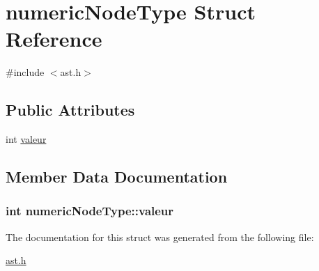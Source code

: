 \hypertarget{structnumericNodeType}{}\section{numeric\+Node\+Type Struct Reference}
\label{structnumericNodeType}


{\ttfamily \#include $<$ast.\+h$>$}

\subsection*{Public Attributes}
\begin{DoxyCompactItemize}
\item 
int \hyperlink{structnumericNodeType_a83d1186d182d49a378276ccaa72031c6}{valeur}
\end{DoxyCompactItemize}


\subsection{Member Data Documentation}
\subsubsection[{\texorpdfstring{valeur}{valeur}}]{\setlength{\rightskip}{0pt plus 5cm}int numeric\+Node\+Type\+::valeur}\hypertarget{structnumericNodeType_a83d1186d182d49a378276ccaa72031c6}{}\label{structnumericNodeType_a83d1186d182d49a378276ccaa72031c6}


The documentation for this struct was generated from the following file\+:\begin{DoxyCompactItemize}
\item 
\hyperlink{ast_8h}{ast.\+h}\end{DoxyCompactItemize}
